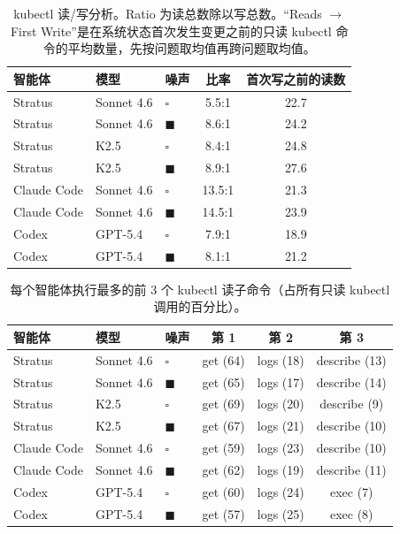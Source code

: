 \documentclass[11pt,UTF8,fontset=fandol]{ctexart}
\begin{document}
\begin{table}[H]\centering
\caption{kubectl 读/写分析。Ratio 为读总数除以写总数。“Reads $\rightarrow$ First Write”是在系统状态首次发生变更之前的只读 kubectl 命令的平均数量，先按问题取均值再跨问题取均值。}
\label{tab:9}
\begin{tabular}{lllcc}
\toprule
智能体 & 模型 & 噪声 & 比率 & 首次写之前的读数 \\
\midrule
Stratus & Sonnet 4.6 & $\square$ & 5.5:1 & 22.7 \\
Stratus & Sonnet 4.6 & $\blacksquare$ & 8.6:1 & 24.2 \\
Stratus & K2.5 & $\square$ & 8.4:1 & 24.8 \\
Stratus & K2.5 & $\blacksquare$ & 8.9:1 & 27.6 \\
Claude Code & Sonnet 4.6 & $\square$ & 13.5:1 & 21.3 \\
Claude Code & Sonnet 4.6 & $\blacksquare$ & 14.5:1 & 23.9 \\
Codex & GPT-5.4 & $\square$ & 7.9:1 & 18.9 \\
Codex & GPT-5.4 & $\blacksquare$ & 8.1:1 & 21.2 \\
\bottomrule
\end{tabular}
\end{table}

\begin{table}[H]\centering
\caption{每个智能体执行最多的前 3 个 kubectl 读子命令（占所有只读 kubectl 调用的百分比）。}
\label{tab:10}
\begin{tabular}{lllccc}
\toprule
智能体 & 模型 & 噪声 & 第 1 & 第 2 & 第 3 \\
\midrule
Stratus & Sonnet 4.6 & $\square$ & get (64) & logs (18) & describe (13) \\
Stratus & Sonnet 4.6 & $\blacksquare$ & get (65) & logs (17) & describe (14) \\
Stratus & K2.5 & $\square$ & get (69) & logs (20) & describe (9) \\
Stratus & K2.5 & $\blacksquare$ & get (67) & logs (21) & describe (10) \\
Claude Code & Sonnet 4.6 & $\square$ & get (59) & logs (23) & describe (10) \\
Claude Code & Sonnet 4.6 & $\blacksquare$ & get (62) & logs (19) & describe (11) \\
Codex & GPT-5.4 & $\square$ & get (60) & logs (24) & exec (7) \\
Codex & GPT-5.4 & $\blacksquare$ & get (57) & logs (25) & exec (8) \\
\bottomrule
\end{tabular}
\end{table}
\end{document}
